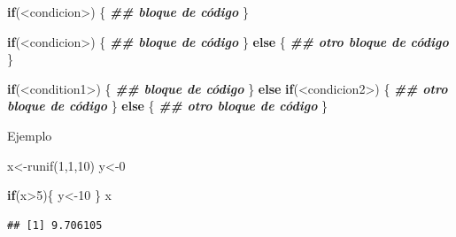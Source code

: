 \documentclass[
  12pt,
]{book}
\newenvironment{Shaded}{\begin{snugshade}}{\end{snugshade}}
\newcommand{\ControlFlowTok}[1]{\textcolor[rgb]{0.13,0.29,0.53}{\textbf{#1}}}
\newcommand{\DecValTok}[1]{\textcolor[rgb]{0.00,0.00,0.81}{#1}}
\newcommand{\DocumentationTok}[1]{\textcolor[rgb]{0.56,0.35,0.01}{\textbf{\textit{#1}}}}
\newcommand{\FunctionTok}[1]{\textcolor[rgb]{0.00,0.00,0.00}{#1}}
\newcommand{\NormalTok}[1]{#1}
\newcommand{\OtherTok}[1]{\textcolor[rgb]{0.56,0.35,0.01}{#1}}
\newcommand{\SpecialCharTok}[1]{\textcolor[rgb]{0.00,0.00,0.00}{#1}}
\begin{document}
\begin{Shaded}
\begin{Highlighting}[]
\ControlFlowTok{if}\NormalTok{(}\SpecialCharTok{\textless{}}\NormalTok{condicion}\SpecialCharTok{\textgreater{}}\NormalTok{) \{}
  \DocumentationTok{\#\# bloque de código}
\NormalTok{\}}
\end{Highlighting}
\end{Shaded}

\begin{Shaded}
\begin{Highlighting}[]
\ControlFlowTok{if}\NormalTok{(}\SpecialCharTok{\textless{}}\NormalTok{condicion}\SpecialCharTok{\textgreater{}}\NormalTok{) \{}
  \DocumentationTok{\#\# bloque de código}
\NormalTok{\} }\ControlFlowTok{else}\NormalTok{ \{}
  \DocumentationTok{\#\# otro bloque de código}
\NormalTok{\}}
\end{Highlighting}
\end{Shaded}

\begin{Shaded}
\begin{Highlighting}[]
\ControlFlowTok{if}\NormalTok{(}\SpecialCharTok{\textless{}}\NormalTok{condition1}\SpecialCharTok{\textgreater{}}\NormalTok{) \{}
  \DocumentationTok{\#\# bloque de código}
\NormalTok{\} }\ControlFlowTok{else} \ControlFlowTok{if}\NormalTok{(}\SpecialCharTok{\textless{}}\NormalTok{condicion2}\SpecialCharTok{\textgreater{}}\NormalTok{) \{}
  \DocumentationTok{\#\# otro bloque de código}
\NormalTok{\} }\ControlFlowTok{else}\NormalTok{ \{}
  \DocumentationTok{\#\# otro bloque de código}
\NormalTok{\}}
\end{Highlighting}
\end{Shaded}

Ejemplo

\begin{Shaded}
\begin{Highlighting}[]
\NormalTok{x}\OtherTok{\textless{}{-}}\FunctionTok{runif}\NormalTok{(}\DecValTok{1}\NormalTok{,}\DecValTok{1}\NormalTok{,}\DecValTok{10}\NormalTok{)}
\NormalTok{y}\OtherTok{\textless{}{-}}\DecValTok{0}

\ControlFlowTok{if}\NormalTok{(x}\SpecialCharTok{\textgreater{}}\DecValTok{5}\NormalTok{)\{}
\NormalTok{  y}\OtherTok{\textless{}{-}}\DecValTok{10}
\NormalTok{\}}
\NormalTok{x}
\end{Highlighting}
\end{Shaded}

\begin{verbatim}
## [1] 9.706105
\end{verbatim}
\end{document}
